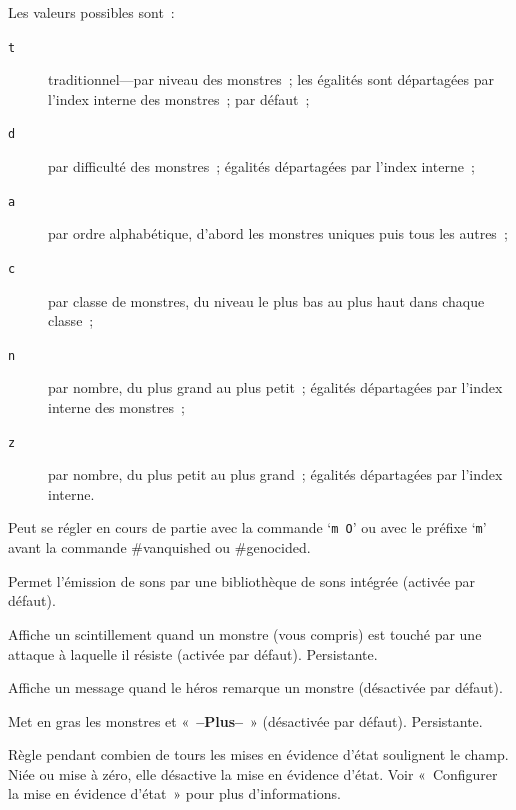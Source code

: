 \documentclass[titlepage]{article}
\begin{document}
\begin{description}
Les valeurs possibles sont~:
\begin{description}
\item[{\texttt{t}}]
traditionnel---par niveau des monstres~; les égalités sont départagées par
l'index interne des monstres~; par défaut~;
\item[{\texttt{d}}]
par difficulté des monstres~; égalités départagées par l'index interne~;
\item[{\texttt{a}}]
par ordre alphabétique, d'abord les monstres uniques puis tous les
autres~;
\item[{\texttt{c}}]
par classe de monstres, du niveau le plus bas au plus haut dans chaque
classe~;
\item[{\texttt{n}}]
par nombre, du plus grand au plus petit~; égalités départagées par l'index
interne des monstres~;
\item[{\texttt{z}}]
par nombre, du plus petit au plus grand~; égalités départagées par l'index
interne.
\end{description}
Peut se régler en cours de partie avec la commande `\texttt{m O}' ou avec
le préfixe `\texttt{m}' avant la commande \#vanquished ou \#genocided.

\item[{sounds}]
Permet l'émission de sons par une bibliothèque de sons intégrée (activée
par défaut).

\item[{sparkle}]
Affiche un scintillement quand un monstre (vous compris) est touché par
une attaque à laquelle il résiste (activée par défaut).
Persistante.

\item[{spot\_monsters}]
Affiche un message quand le héros remarque un monstre (désactivée par
défaut).

\item[{standout}]
Met en gras les monstres et «~\textbf{--Plus--}~» (désactivée par
défaut).
Persistante.

\item[{statushilites}]
Règle pendant combien de tours les mises en évidence d'état soulignent le
champ.
Niée ou mise à zéro, elle désactive la mise en évidence d'état.
Voir «~Configurer la mise en évidence d'état~» pour plus
d'informations.


\end{description}
\end{document}
